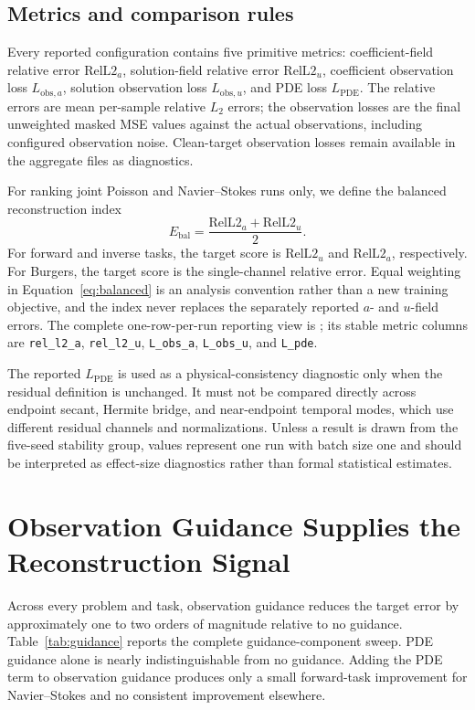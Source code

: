 \documentclass[twoside,11pt]{article}
\newcommand{\Ebal}{E_{\mathrm{bal}}}
\newcommand{\relA}{\mathrm{RelL2}_a}
\newcommand{\relU}{\mathrm{RelL2}_u}
\newcommand{\Lobsa}{L_{\mathrm{obs},a}}
\newcommand{\Lobsu}{L_{\mathrm{obs},u}}
\newcommand{\Lpde}{L_{\mathrm{PDE}}}
\begin{document}
\subsection{Metrics and comparison rules}
\label{sec:metrics}

Every reported configuration contains five primitive metrics: coefficient-field
relative error \(\relA\), solution-field relative error \(\relU\), coefficient
observation loss \(\Lobsa\), solution observation loss \(\Lobsu\), and PDE loss
\(\Lpde\).  The relative errors are mean per-sample relative \(L_2\) errors;
the observation losses are the final unweighted masked MSE values against the
actual observations, including configured observation noise.  Clean-target
observation losses remain available in the aggregate files as diagnostics.

For ranking joint Poisson and Navier--Stokes runs only, we define the balanced
reconstruction index
\begin{equation}
  \Ebal = \frac{\relA + \relU}{2}.
  \label{eq:balanced}
\end{equation}
For forward and inverse tasks, the target score is \(\relU\) and \(\relA\),
respectively.  For Burgers, the target score is the single-channel relative
error.  Equal weighting in Equation~\ref{eq:balanced} is an analysis convention
rather than a new training objective, and the index never replaces the
separately reported \(a\)- and \(u\)-field errors.  The complete one-row-per-run
reporting view is ; its stable metric columns
are \texttt{rel\_l2\_a}, \texttt{rel\_l2\_u}, \texttt{L\_obs\_a},
\texttt{L\_obs\_u}, and \texttt{L\_pde}.

The reported \(\Lpde\) is used as a physical-consistency diagnostic only
when the residual definition is unchanged.  It must not be compared directly
across endpoint secant, Hermite bridge, and near-endpoint temporal modes,
which use different residual channels and normalizations.  Unless a result is
drawn from the five-seed stability group, values represent one run with batch
size one and should be interpreted as effect-size diagnostics rather than
formal statistical estimates.

\section{Observation Guidance Supplies the Reconstruction Signal}
\label{sec:guidance}

Across every problem and task, observation guidance reduces the target error
by approximately one to two orders of magnitude relative to no guidance.
Table~\ref{tab:guidance} reports the complete guidance-component sweep.  PDE
guidance alone is nearly indistinguishable from no guidance.  Adding the PDE
term to observation guidance produces only a small forward-task improvement
for Navier--Stokes and no consistent improvement elsewhere.
\end{document}

